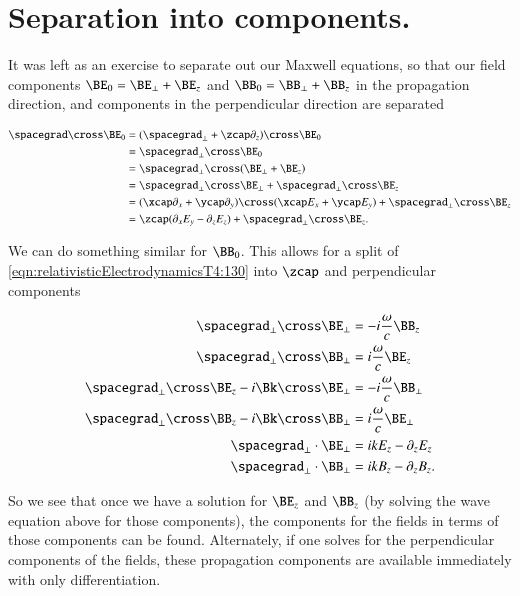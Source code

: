 \section{Separation into components.}

It was left as an exercise to separate out our Maxwell equations, so that our field components $\BE_0 = \BE_\perp + \BE_z$ and $\BB_0 = \BB_\perp + \BB_z$ in the propagation direction, and components in the perpendicular direction are separated

\begin{align*}
\spacegrad \cross \BE_0 
&=
(\spacegrad_\perp + \zcap\partial_z) \cross \BE_0 \\
&=
\spacegrad_\perp \cross \BE_0 \\
&=
\spacegrad_\perp \cross (\BE_\perp + \BE_z) \\
&=
\spacegrad_\perp \cross \BE_\perp 
+\spacegrad_\perp \cross \BE_z \\
&=
( \xcap \partial_x +\ycap \partial_y ) \cross ( \xcap E_x +\ycap E_y ) 
+\spacegrad_\perp \cross \BE_z \\
&=
\zcap (\partial_x E_y - \partial_z E_z) 
+\spacegrad_\perp \cross \BE_z.
\end{align*}

We can do something similar for $\BB_0$.  This allows for a split of \ref{eqn:relativisticElectrodynamicsT4:130} into $\zcap$ and perpendicular components

\begin{align}\label{eqn:relativisticElectrodynamicsT4:130b}
\spacegrad_\perp \cross \BE_\perp &= -i \frac{\omega}{c} \BB_z \\
\spacegrad_\perp \cross \BB_\perp &= i \frac{\omega}{c} \BE_z \\
\spacegrad_\perp \cross \BE_z - i \Bk \cross \BE_\perp &= -i \frac{\omega}{c} \BB_\perp \\
\spacegrad_\perp \cross \BB_z - i \Bk \cross \BB_\perp &= i \frac{\omega}{c} \BE_\perp \\
\spacegrad_\perp \cdot \BE_\perp &= i k E_z - \partial_z E_z \\
\spacegrad_\perp \cdot \BB_\perp &= i k B_z - \partial_z B_z.
\end{align}

So we see that once we have a solution for $\BE_z$ and $\BB_z$ (by solving the wave equation above for those components), the components for the fields in terms of those components can be found.  Alternately, if one solves for the perpendicular components of the fields, these propagation components are available immediately with only differentiation.

